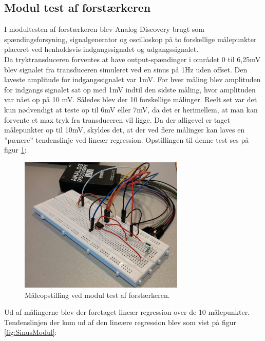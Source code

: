 \subsection{Modul test af forstærkeren}
I modultesten af forstærkeren blev Analog Discovery brugt som spændingsforsyning, signalgenerator og oscilloskop på to forskellige målepunkter placeret ved henholdsvis indgangssignalet og udgangssignalet.\\
Da tryktransduceren forventes at have output-spændinger i området 0 til 6,25mV blev signalet fra transduceren simuleret ved en sinus på 1Hz uden offset. Den laveste amplitude for indgangssignalet var 1mV. For hver måling blev amplituden for indgangs signalet sat op med 1mV indtil den sidste måling, hvor amplituden var nået op på 10 mV. Således blev der 10 forskellige målinger. Reelt set var det kun nødvendigt at teste op til 6mV eller 7mV, da det er herimellem, at man kan forvente et max tryk fra transduceren vil ligge. Da der alligevel er taget målepunkter op til 10mV, skyldes det, at der ved flere målinger kan laves en ”pænere” tendenslinje ved lineær regression. Opstillingen til denne test ses på figur \ref{fig:ForstaerkerTest}:

\begin{figure}[H]
	\centering
	\includegraphics[width=0.7\textwidth]{Figurer/Hardware/ForstaerkerTest}
	\caption{Måleopstilling ved modul test af forstærkeren.}
	\label{fig:ForstaerkerTest}
\end{figure}

Ud af målingerne blev der foretaget lineær regression over de 10 målepunkter. Tendenslinjen der kom ud af den lineære regression blev som vist på figur \ref{fig:SinusModul}:

